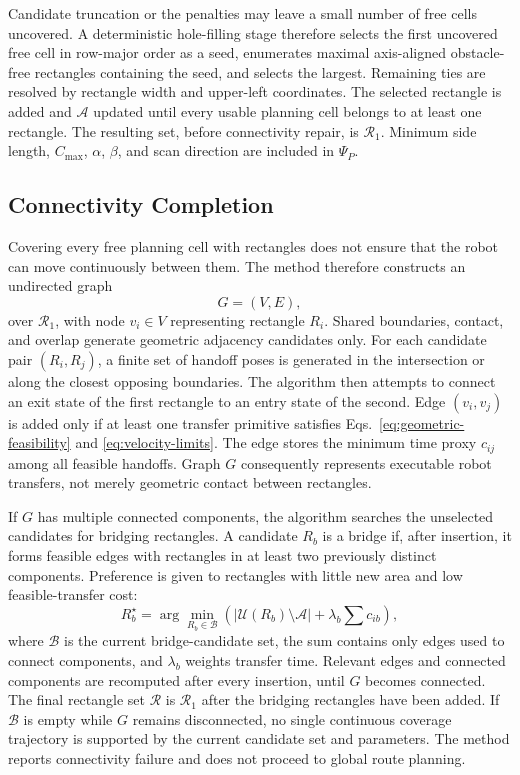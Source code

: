 Candidate truncation or the penalties may leave a small number of free cells uncovered. A deterministic hole-filling stage therefore selects the first uncovered free cell in row-major order as a seed, enumerates maximal axis-aligned obstacle-free rectangles containing the seed, and selects the largest. Remaining ties are resolved by rectangle width and upper-left coordinates. The selected rectangle is added and $\mathcal A$ updated until every usable planning cell belongs to at least one rectangle. The resulting set, before connectivity repair, is $\mathcal R_1$. Minimum side length, $C_{\max}$, $\alpha$, $\beta$, and scan direction are included in $\Psi_P$.

\subsection{Connectivity Completion}

Covering every free planning cell with rectangles does not ensure that the robot can move continuously between them. The method therefore constructs an undirected graph
\begin{equation}
G=(V,E),
\tag{8}
\label{eq:feasible-graph}
\end{equation}
over $\mathcal R_1$, with node $v_i\in V$ representing rectangle $R_i$. Shared boundaries, contact, and overlap generate geometric adjacency candidates only. For each candidate pair $(R_i,R_j)$, a finite set of handoff poses is generated in the intersection or along the closest opposing boundaries. The algorithm then attempts to connect an exit state of the first rectangle to an entry state of the second. Edge $(v_i,v_j)$ is added only if at least one transfer primitive satisfies Eqs.~\eqref{eq:geometric-feasibility} and \eqref{eq:velocity-limits}. The edge stores the minimum time proxy $c_{ij}$ among all feasible handoffs. Graph $G$ consequently represents executable robot transfers, not merely geometric contact between rectangles.

If $G$ has multiple connected components, the algorithm searches the unselected candidates for bridging rectangles. A candidate $R_b$ is a bridge if, after insertion, it forms feasible edges with rectangles in at least two previously distinct components. Preference is given to rectangles with little new area and low feasible-transfer cost:
\begin{equation}
R_b^\star=\arg\min_{R_b\in\mathcal B}\left(|\mathcal U(R_b)\setminus\mathcal A|+\lambda_b\sum c_{ib}\right),
\tag{9}
\label{eq:bridge-cost}
\end{equation}
where $\mathcal B$ is the current bridge-candidate set, the sum contains only edges used to connect components, and $\lambda_b$ weights transfer time. Relevant edges and connected components are recomputed after every insertion, until $G$ becomes connected. The final rectangle set $\mathcal R$ is $\mathcal R_1$ after the bridging rectangles have been added. If $\mathcal B$ is empty while $G$ remains disconnected, no single continuous coverage trajectory is supported by the current candidate set and parameters. The method reports connectivity failure and does not proceed to global route planning.

